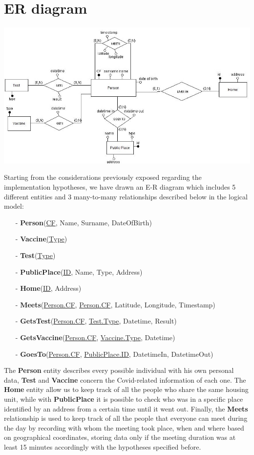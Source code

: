 \documentclass[a4paper,12pt]{article}
\begin{document}
\section{ER diagram}
\paragraph{}
	\begin{center}
 		\includegraphics[width = 10 cm]{ER_diagram.jpg}
	\end{center}
\par Starting from the considerations previously exposed regarding the implementation hypotheses, we have drawn an E-R diagram which includes 5 different entities and 3 many-to-many relationships described below in the logical model: \par
  \begin{itemize}[noitemsep]
   	\item[-]	\textbf{Person}(\underline{CF}, Name, Surname, DateOfBirth)
	\item[-]	\textbf{Vaccine}\underline{(Type})
	\item[-]	\textbf{Test}(\underline{Type})
	\item[-]	\textbf{PublicPlace}(\underline{ID}, Name, Type, Address)
	\item[-]	\textbf{Home}(\underline{ID}, Address)
	\item[-]	\textbf{Meets}(\underline{Person.CF}, \underline{Person.CF}, Latitude, Longitude, Timestamp)
	\item[-]	\textbf{GetsTest}(\underline{Person.CF}, \underline{Test.Type}, Datetime, Result)
	\item[-]	\textbf{GetsVaccine}(\underline{Person.CF}, \underline{Vaccine.Type}, Datetime)
	\item[-]	\textbf{GoesTo}(\underline{Person.CF}, \underline{PublicPlace.ID}, DatetimeIn, DatetimeOut)
  \end{itemize} \par
The \textbf{Person} entity describes every possible individual with his own personal data, \textbf{Test} and \textbf{Vaccine} concern the Covid-related information of each one. The \textbf{Home} entity allow us to keep track of all the people who share the same housing unit, while with \textbf{PublicPlace} it is possible to check who was in a specific place identified by an address from a certain time until it went out. Finally, the \textbf{Meets} relationship is used to keep track of all the people that everyone can meet during the day by recording with whom the meeting took place, when and where based on geographical coordinates, storing data only if the meeting duration was at least 15 minutes accordingly with the hypotheses specified before.
\end{document}
